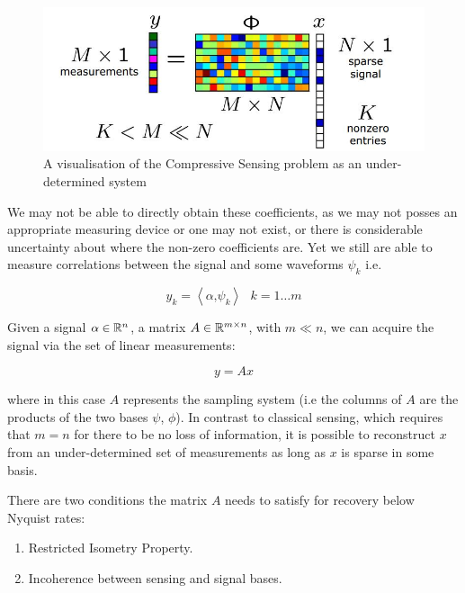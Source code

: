 \documentclass[12pt]{report}
\begin{document}
\begin{figure}[h]
\centering
\includegraphics[height = 7 cm, width=\textwidth]{compressive_sensing_example.jpg}
\caption{A visualisation of the Compressive Sensing problem as an under-determined system}
\label{l1l2}
\end{figure}


We may not be able to directly obtain these coefficients, as we may not posses an appropriate measuring device or one may not exist, or there is considerable uncertainty about where the non-zero coefficients are. Yet we still are able to measure correlations between the signal and some waveforms \(\psi_{k}\) i.e. 

\begin{equation}
y_{k} = \left\langle \alpha \text{,} \psi_{k} \right\rangle \text{ } k = 1 \ldots m
\end{equation}


Given a signal \(\alpha \in {\mathbb{R}}^n\), a matrix \(A \in {\mathbb{R}}^{m \times n}\), with \(m \ll n\),  we can acquire the signal via the set of linear measurements:

\begin{equation}
y = Ax
\end{equation}

where in this case \(A\) represents the sampling system (i.e the columns of \(A\) are the products of the two bases \(\psi\), \(\phi\)). In contrast to classical sensing, which requires that \(m = n\) for there to be no loss of information, it is possible to reconstruct \(x\) from an under-determined set of measurements as long as \(x\) is sparse in some basis. 

There are two conditions the matrix \(A\) needs to satisfy for recovery below Nyquist rates:

\begin{enumerate}
\item Restricted Isometry Property.
\item Incoherence between sensing and signal bases.
\end{enumerate}
\end{document}
